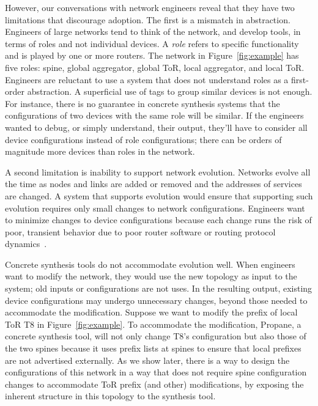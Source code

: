 \documentclass{sig-alternate-10pt}
\begin{document}
However, our conversations with network engineers reveal that they have two limitations that discourage adoption.  The first is a mismatch in abstraction. Engineers of large networks tend to think of the network, and develop tools, in terms of roles and not individual devices. A {\em role} refers to specific functionality and is played by one or more routers. The network in Figure~\ref{fig:example} has five roles: spine, global aggregator, global ToR, local aggregator, and local ToR.  Engineers are reluctant to use a system that does not understand roles as a first-order abstraction. A superficial use of tags to group similar devices is not enough. For instance, there is no guarantee in concrete synthesis systems that the configurations of two devices with the same role will be similar.  If the engineers wanted to debug, or simply understand, their output, they'll have to consider all device configurations instead of role configurations;  there can be orders of magnitude more devices than roles in the network.

A second limitation is inability to support network evolution. Networks evolve all the time as nodes and links are added or removed and the addresses of services are changed. A system that supports evolution would ensure that supporting such evolution requires only small changes to network configurations. Engineers want to minimize changes to device configurations because each change runs the risk of poor, transient behavior due to poor router software or routing protocol dynamics~\cite{ratulbgpmisconfigs}.

Concrete synthesis tools do not accommodate evolution well. When engineers want to modify the network, they would use the new topology as input to the system; old inputs or configurations are not uses. In the resulting output, existing device configurations may undergo unnecessary changes, beyond those needed to accommodate the modification. Suppose we want to modify the prefix of local ToR T8 in  Figure~\ref{fig:example}. To accommodate the modification, Propane, a concrete synthesis tool, will not only change T8's configuration but also those of the two spines because it uses prefix lists at spines to ensure that local prefixes are not advertised externally.  As we show later, there is a way to design the configurations of this network in a way that does not require spine configuration changes to accommodate ToR prefix (and other) modifications, by exposing the inherent structure in this topology to the synthesis tool.

\end{document}
